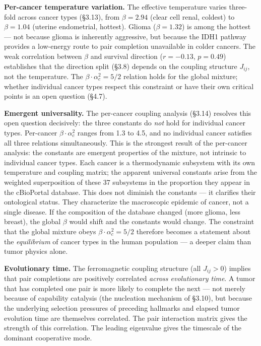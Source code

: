 \documentclass[
  11pt,
]{article}
\begin{document}
\textbf{Per-cancer temperature variation.} The effective temperature
varies three-fold across cancer types (§3.13), from \(\beta = 2.94\)
(clear cell renal, coldest) to \(\beta = 1.04\) (uterine endometrial,
hottest). Glioma (\(\beta = 1.32\)) is among the hottest --- not because
glioma is inherently aggressive, but because the IDH1 pathway provides a
low-energy route to pair completion unavailable in colder cancers. The
weak correlation between \(\beta\) and survival direction
(\(r = -0.13\), \(p = 0.49\)) establishes that the direction split
(§3.8) depends on the coupling structure \(J_{ij}\), not the
temperature. The \(\beta \cdot \alpha_c^2 = 5/2\) relation holds for the
global mixture; whether individual cancer types respect this constraint
or have their own critical points is an open question (§4.7).

\textbf{Emergent universality.} The per-cancer coupling analysis (§3.14)
resolves this open question decisively: the three constants do
\emph{not} hold for individual cancer types. Per-cancer
\(\beta \cdot \alpha_c^2\) ranges from 1.3 to 4.5, and no individual
cancer satisfies all three relations simultaneously. This is the
strongest result of the per-cancer analysis: the constants are emergent
properties of the mixture, not intrinsic to individual cancer types.
Each cancer is a thermodynamic subsystem with its own temperature and
coupling matrix; the apparent universal constants arise from the
weighted superposition of these 37 subsystems in the proportion they
appear in the cBioPortal database. This does not diminish the constants
--- it clarifies their ontological status. They characterize the
macroscopic epidemic of cancer, not a single disease. If the composition
of the database changed (more glioma, less breast), the global \(\beta\)
would shift and the constants would change. The constraint that the
global mixture obeys \(\beta \cdot \alpha_c^2 = 5/2\) therefore becomes
a statement about the \emph{equilibrium} of cancer types in the human
population --- a deeper claim than tumor physics alone.

\textbf{Evolutionary time.} The ferromagnetic coupling structure (all
\(J_{ij} > 0\)) implies that pair completions are positively correlated
\emph{across evolutionary time}. A tumor that has completed one pair is
more likely to complete the next --- not merely because of capability
catalysis (the nucleation mechanism of §3.10), but because the
underlying selection pressures of preceding hallmarks and elapsed tumor
evolution time are themselves correlated. The pair interaction matrix
gives the strength of this correlation. The leading eigenvalue gives the
timescale of the dominant cooperative mode.
\end{document}
